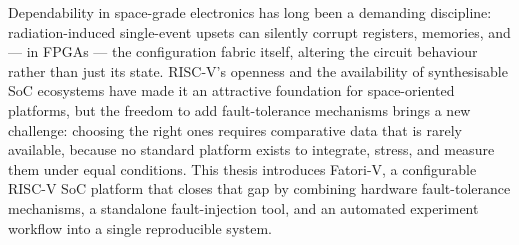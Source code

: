 Dependability in space-grade electronics has long been a demanding discipline: radiation-induced single-event upsets can silently corrupt registers, memories, and --- in \acp{FPGA} --- the configuration fabric itself, altering the circuit behaviour rather than just its state. \ac{RISC-V}'s openness and the availability of synthesisable \ac{SoC} ecosystems have made it an attractive foundation for space-oriented platforms, but the freedom to add fault-tolerance mechanisms brings a new challenge: choosing the right ones requires comparative data that is rarely available, because no standard platform exists to integrate, stress, and measure them under equal conditions. This thesis introduces \ac{Fatori-V}, a configurable \ac{RISC-V} \ac{SoC} platform that closes that gap by combining hardware fault-tolerance mechanisms, a standalone fault-injection tool, and an automated experiment workflow into a single reproducible system.